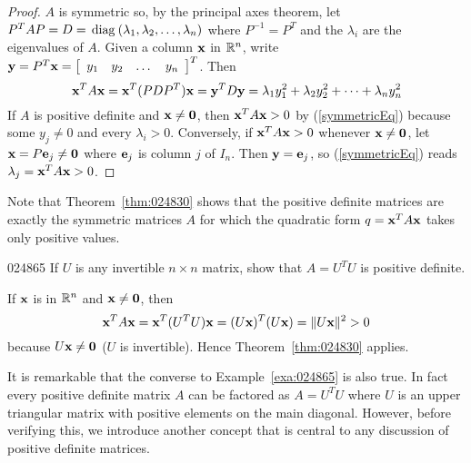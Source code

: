 \begin{proof}
$A$ is symmetric so, by the principal axes theorem, let $P^{T}AP = D = \thinspace\operatorname{diag\medspace}(\lambda_{1}, \lambda_{2}, \dots, \lambda_{n})$ where $P^{-1} = P^{T}$ and the $\lambda_{i}$ are the eigenvalues of $A$. Given a column $\textbf{x}$ in $\mathbb{R}^n$, write $\textbf{y} = P^{T}\textbf{x} = \left[ \begin{array}{cccc}
y_{1} & y_{2} & \dots & y_{n}
\end{array}\right]^T$. Then
\begin{equation} \label{symmetricEq}
\textbf{x}^TA\textbf{x} = \textbf{x}^T(PDP^T)\textbf{x} = \textbf{y}^TD\textbf{y} = \lambda_{1}y_{1}^2 + \lambda_{2}y_{2}^2 + \dots + \lambda_{n}y_{n}^2
\end{equation}
If $A$ is positive definite and $\textbf{x} \neq \textbf{0}$, then $\textbf{x}^{T}A\textbf{x} > 0$ by (\ref{symmetricEq}) because some $y_{j} \neq 0$ and every $\lambda_{i} > 0$. Conversely, if $\textbf{x}^{T}A\textbf{x} > 0$ whenever $\textbf{x} \neq \textbf{0}$, let $\textbf{x} = P\textbf{e}_{j} \neq \textbf{0}$ where $\textbf{e}_{j}$ is column $j$ of $I_{n}$. Then $\textbf{y} = \textbf{e}_{j}$, so (\ref{symmetricEq}) reads $\lambda_{j} = \textbf{x}^{T}A\textbf{x} > 0$.
\end{proof}

\noindent Note that Theorem~\ref{thm:024830} shows that the positive definite matrices are exactly the symmetric matrices $A$ for which the quadratic form $q = \textbf{x}^{T}A\textbf{x}$ takes only positive values.


\begin{example}{}{024865}
If $U$ is any invertible $n \times n$ matrix, show that $A = U^{T}U$ is positive definite.


\begin{solution}
  If $\textbf{x}$ is in $\mathbb{R}^n$ and $\textbf{x} \neq \textbf{0}$, then
\begin{equation*}
\textbf{x}^TA\textbf{x} =  \textbf{x}^T(U^TU)\textbf{x} = (U\textbf{x})^T(U\textbf{x})= \| U\textbf{x} \|^2 > 0
\end{equation*}
because $U\textbf{x} \neq \textbf{0}$ ($U$ is invertible). Hence Theorem~\ref{thm:024830} applies.
\end{solution}
\end{example}

It is remarkable that the converse to Example~\ref{exa:024865} is also true. In fact every positive definite matrix $A$ can be factored as $A = U^{T}U$ where $U$ is an upper triangular matrix with positive elements on the main 
diagonal. However, before verifying this, we introduce another concept 
that is central to any discussion of positive definite matrices.



